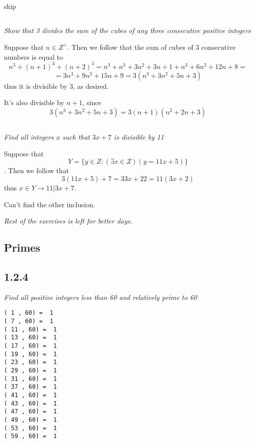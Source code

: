 \documentclass[11pt,oneside,titlepage]{book}
\begin{document}
\subsection{}

\subsection{}

skip

\subsection{}

\textit{Show that 3 divides the sum of the cubes of any three consecutive positive integers}

Suppose that $n \in Z^+$. Then we follow that the sum of cubes of 3 consecutive
numbers is equal to
$$n^3 + (n + 1)^3 + (n + 2)^3 = n^3 + n^3 + 3n^2 + 3n + 1 + n^3 + 6n^2 + 12n + 8 =$$
$$ = 3n^3 + 9n^2 + 15n + 9 = 3(n^3 + 3n^2 + 5n + 3)$$
thus it is divisible by 3, as desired.

It's also divisible by $n + 1$, since
$$3(n^3 + 3n^2 + 5n + 3) = 3(n + 1)(n^2 + 2n + 3)$$

\subsection{}

\textit{Find all integers $x$ such that $3x + 7$ is divisible by 11}

Suppose that
$$Y = \{y \in Z: (\exists x \in Z)(y = 11x + 5)\}$$.
Then we follow that
$$3(11 x + 5) + 7 = 33x + 22 = 11(3x + 2)$$
thus $x \in Y \to 11|3x + 7$.

Can't find the other inclusion.

\textit{Rest of the exercises is left for better days.}

\subsection{Primes}

\subsection*{1.2.4}

\textit{Find all positive integers less than 60 and relatively prime to 60}

\begin{verbatim}
( 1 , 60) =  1
( 7 , 60) =  1
( 11 , 60) =  1
( 13 , 60) =  1
( 17 , 60) =  1
( 19 , 60) =  1
( 23 , 60) =  1
( 29 , 60) =  1
( 31 , 60) =  1
( 37 , 60) =  1
( 41 , 60) =  1
( 43 , 60) =  1
( 47 , 60) =  1
( 49 , 60) =  1
( 53 , 60) =  1
( 59 , 60) =  1
\end{verbatim}
\end{document}

